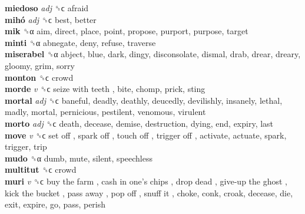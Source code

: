 \textbf{miedoso} \emph{adj}  ␝ϲ  afraid  \\
\textbf{mihó} \emph{adj}  ␝ϲ  best, better  \\
\textbf{mik} ␝α  aim, direct, place, point, propose, purport, purpose, target  \\
\textbf{minti} ␝α  abnegate, deny, refuse, traverse  \\
\textbf{miserabel} ␝α  abject, blue, dark, dingy, disconsolate, dismal, drab, drear, dreary, gloomy, grim, sorry  \\
\textbf{monton} ␝ϲ  crowd  \\
\textbf{morde} \emph{v}  ␝ϲ   seize with teeth , bite, chomp, prick, sting  \\
\textbf{mortal} \emph{adj}  ␝ϲ  baneful, deadly, deathly, deucedly, devilishly, insanely, lethal, madly, mortal, pernicious, pestilent, venomous, virulent  \\
\textbf{morto} \emph{adj}  ␝ϲ  death, decease, demise, destruction, dying, end, expiry, last  \\
\textbf{move} \emph{v}  ␝ϲ   set off ,  spark off ,  touch off ,  trigger off , activate, actuate, spark, trigger, trip  \\
\textbf{mudo} ␝α  dumb, mute, silent, speechless  \\
\textbf{multitut} ␝ϲ  crowd  \\
\textbf{muri} \emph{v}  ␝ϲ   buy the farm ,  cash in one’s chips ,  drop dead ,  give-up the ghost ,  kick the bucket ,  pass away ,  pop off ,  snuff it , choke, conk, croak, decease, die, exit, expire, go, pass, perish  \\
